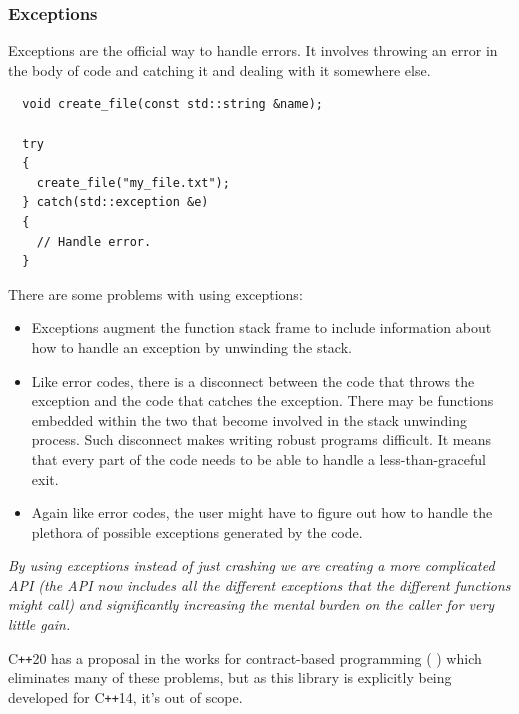 \documentclass[12pt]{report}
\newcommand{\citebu}[1]{(\citenoparen{#1})}
\newcommand{\citenoparen}[1]{\citeauthor{#1} \citeyear{#1}}
\newcommand{\cpp}{C\texttt{++}}
\newcommand{\quotebu}[2]
{
  \begin{displayquote}[\citenoparen{#2}]
    \textit{#1}
  \end{displayquote}
}
\theoremstyle{definition}
\begin{document}
        \subsubsection{Exceptions}

          Exceptions are the official way to handle errors. It involves
          throwing an error in the body of code and catching it and dealing
          with it somewhere else.

          \begin{lstlisting}
  void create_file(const std::string &name);

  try
  {
    create_file("my_file.txt");
  } catch(std::exception &e)
  {
    // Handle error.
  }
          \end{lstlisting}
          \vspace{5mm}

          There are some problems with using exceptions:

          \begin{itemize}
            \item Exceptions augment the function stack frame to include
              information about how to handle an exception by unwinding the stack.
            \item Like error codes, there is a disconnect between the code
              that throws the exception and the code that catches the exception.
              There may be functions embedded within the two that become
              involved in the stack unwinding process. Such disconnect makes
              writing robust programs difficult. It means that every part of
              the code needs to be able to handle a less-than-graceful exit.
            \item Again like error codes, the user might have to figure out
              how to handle the plethora of possible exceptions generated by
              the code.
          \end{itemize}

          \quotebu{
            By using exceptions instead of just crashing we are creating a more
            complicated API (the API now includes all the different exceptions
            that the different functions might call) and significantly
            increasing the mental burden on the caller for very little gain.
          }{gamasutra}

          \cpp20 has a proposal in the works for contract-based programming \citebu{contracts}
          which eliminates many of these problems, but as this library is
          explicitly being developed for \cpp14, it's out of scope. \\
\end{document}
